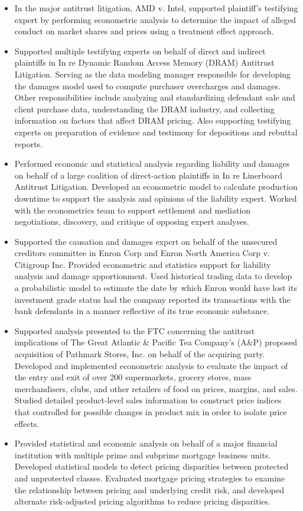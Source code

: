 \documentclass[12pt]{article}
\begin{document}
\begin{itemize}
	\item In the major antitrust litigation, AMD v. Intel, supported plaintiff’s testifying expert by performing econometric analysis to determine the impact of alleged conduct on market shares and prices using a treatment effect approach.
	\item Supported multiple testifying experts on behalf of direct and indirect plaintiffs in In re Dynamic Random Access Memory (DRAM) Antitrust Litigation. Serving as the data modeling manager responsible for developing the damages model used to compute purchaser overcharges and damages. Other responsibilities include analyzing and standardizing defendant sale and client purchase data, understanding the DRAM industry, and collecting information on factors that affect DRAM pricing. Also supporting testifying experts on preparation of evidence and testimony for depositions and rebuttal reports.
	\item Performed economic and statistical analysis regarding liability and damages on behalf of a large coalition of direct-action plaintiffs in In re Linerboard Antitrust Litigation. Developed an econometric model to calculate production downtime to support the analysis and opinions of the liability expert. Worked with the econometrics team to support settlement and mediation negotiations, discovery, and critique of opposing expert analyses.
	\item Supported the causation and damages expert on behalf of the unsecured creditors committee in Enron Corp and Enron North America Corp v. Citigroup Inc. Provided econometric and statistics support for liability analysis and damage apportionment. Used historical trading data to develop a probabilistic model to estimate the date by which Enron would have lost its investment grade status had the company reported its transactions with the bank defendants in a manner reflective of its true economic substance. 
	\item Supported analysis presented to the FTC concerning the antitrust implications of The Great Atlantic \& Pacific Tea Company’s (A\&P) proposed acquisition of Pathmark Stores, Inc. on behalf of the acquiring party. Developed and implemented econometric analysis to evaluate the impact of the entry and exit of over 200 supermarkets, grocery stores, mass merchandisers, clubs, and other retailers of food on prices, margins, and sales. Studied detailed product-level sales information to construct price indices that controlled for possible changes in product mix in order to isolate price effects.
	\item Provided statistical and economic analysis on behalf of a major financial institution with multiple prime and subprime mortgage business units. Developed statistical models to detect pricing disparities between protected and unprotected classes. Evaluated mortgage pricing strategies to examine the relationship between pricing and underlying credit risk, and developed alternate risk-adjusted pricing algorithms to reduce pricing disparities.
	
\end{itemize}
\end{document}
